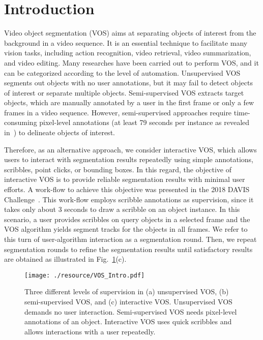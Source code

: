 \documentclass[runningheads]{llncs}
\begin{document}
\section{Introduction}

Video object segmentation (VOS) aims at separating objects of interest from the background in a video sequence. It is an essential technique to facilitate many vision tasks, including action recognition, video retrieval, video summarization, and video editing. Many researches have been carried out to perform VOS, and it can be categorized according to the level of automation. Unsupervised VOS segments out objects with no user annotations, but it may fail to detect objects of interest or separate multiple objects. Semi-supervised VOS extracts target objects, which are manually annotated by a user in the first frame or only a few frames in a video sequence. However, semi-supervised approaches require time-consuming pixel-level annotations (at least 79 seconds per instance as revealed in~\cite{DAVISchallenge2018}) to delineate objects of interest.

Therefore, as an alternative approach, we consider interactive VOS, which allows users to interact with segmentation results repeatedly using simple annotations, \eg scribbles, point clicks, or bounding boxes. In this regard, the objective of interactive VOS is to provide reliable segmentation results with minimal user efforts. A work-flow to achieve this objective was presented in the 2018 DAVIS Challenge~\cite{DAVISchallenge2018}. This work-flow employs scribble annotations as supervision, since it takes only about 3 seconds to draw a scribble on an object instance. In this scenario, a user provides scribbles on query objects in a selected frame and the VOS algorithm yields segment tracks for the objects in all frames. We refer to this turn of user-algorithm interaction as a segmentation round. Then, we repeat segmentation rounds to refine the segmentation results until satisfactory results are obtained as illustrated in Fig.~\ref{fig:VOSIntro}(c).


\begin{figure}[t]\centering
    \texttt{[image: ./resource/VOS\_Intro.pdf]}
\caption{Three different levels of supervision in (a) unsupervised VOS, (b) semi-supervised VOS, and (c) interactive VOS. Unsupervised VOS demands no user interaction. Semi-supervised VOS needs pixel-level annotations of an object. Interactive VOS uses quick scribbles and allows interactions with a user repeatedly.}
\label{fig:VOSIntro}
\end{figure}
\end{document}
